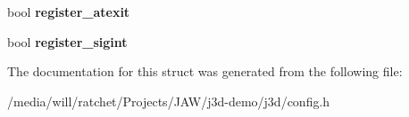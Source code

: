 \begin{DoxyCompactItemize}
\item 
\hypertarget{structj3d_1_1Config_a1152bbbb4b24dcdcc51875eca5ef7cc0}{}bool {\bfseries register\+\_\+atexit}\label{structj3d_1_1Config_a1152bbbb4b24dcdcc51875eca5ef7cc0}

\item 
\hypertarget{structj3d_1_1Config_ac04484824009cc547dd9691b5e4021b4}{}bool {\bfseries register\+\_\+sigint}\label{structj3d_1_1Config_ac04484824009cc547dd9691b5e4021b4}

\end{DoxyCompactItemize}


The documentation for this struct was generated from the following file\+:\begin{DoxyCompactItemize}
\item 
/media/will/ratchet/\+Projects/\+J\+A\+W/j3d-\/demo/j3d/config.\+h\end{DoxyCompactItemize}
